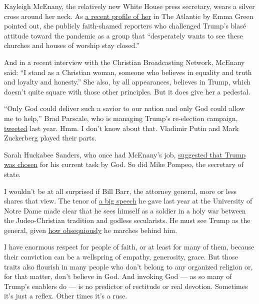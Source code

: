 Kayleigh McEnany, the relatively new White House press secretary, wears
a silver cross around her neck. As
\href{https://www.theatlantic.com/politics/archive/2020/06/kayleigh-mcenany-trump-evangelicals/613471/}{a
recent profile of her} in The Atlantic by Emma Green pointed out, she
publicly faith-shamed reporters who challenged Trump's blasé attitude
toward the pandemic as a group that ``desperately wants to see these
churches and houses of worship stay closed.''

And in a recent interview with the Christian Broadcasting Network,
McEnany said: ``I stand as a Christian woman, someone who believes in
equality and truth and loyalty and honesty.'' She also, by all
appearances, believes in Trump, which doesn't quite square with those
other principles. But it does give her a pedestal.

``Only God could deliver such a savior to our nation and only God could
allow me to help,'' Brad Parscale, who is managing Trump's re-election
campaign,
\href{https://twitter.com/parscale/status/1123212317376811009}{tweeted}
last year. Hmm. I don't know about that. Vladimir Putin and Mark
Zuckerberg played their parts.

Sarah Huckabee Sanders, who once had McEnany's job,
\href{https://www.politico.com/story/2019/04/30/donald-trump-evangelicals-god-1294578}{suggested
that Trump was chosen} for his current task by God. So did Mike Pompeo,
the secretary of state.

I wouldn't be at all surprised if Bill Barr, the attorney general, more
or less shares that view. The tenor of
\href{https://www.justice.gov/opa/speech/attorney-general-william-p-barr-delivers-remarks-law-school-and-de-nicola-center-ethics}{a
big speech} he gave last year at the University of Notre Dame made clear
that he sees himself as a soldier in a holy war between the
Judeo-Christian tradition and godless secularists. He must see Trump as
the general, given
\href{https://www.nytimes3xbfgragh.onion/2019/12/10/opinion/william-barr-trump.html}{how
obsequiously} he marches behind him.

I have enormous respect for people of faith, or at least for many of
them, because their conviction can be a wellspring of empathy,
generosity, grace. But those traits also flourish in many people who
don't belong to any organized religion or, for that matter, don't
believe in God. And invoking God --- as so many of Trump's enablers do
--- is no predictor of rectitude or real devotion. Sometimes it's just a
reflex. Other times it's a ruse.


